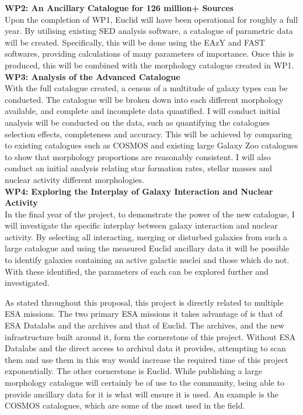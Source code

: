 \documentclass[11pt,usenatbib]{article}
\begin{document}
\noindent \textbf{WP2: An Ancillary Catalogue for 126 million+ Sources} \\
\noindent Upon the completion of WP1, Euclid will have been operational for roughly a full year. By utilising existing SED analysis software, a catalogue of parametric data will be created. Specifically, this will be done using the EAzY and FAST softwares, providing calculations of many parameters of importance. Once this is produced, this will be combined with the morphology catalogue created in WP1. \\

\noindent \textbf{WP3: Analysis of the Advanced Catalogue} \\
With the full catalogue created, a census of a multitude of galaxy types can be conducted. The catalogue will be broken down into each different morphology available, and complete and incomplete data quantified. I will conduct initial analysis will be conducted on the data, such as quantifying the catalogues selection effects, completeness and accuracy. This will be achieved by comparing to existing catalogues such as COSMOS and existing large Galaxy Zoo catalogues to show that morphology proportions are reasonably consistent. I will also conduct an initial analysis relating star formation rates, stellar masses and nuclear activity different morphologies. \\

\noindent \textbf{WP4: Exploring the Interplay of Galaxy Interaction and Nuclear Activity} \\
In the final year of the project, to demonstrate the power of the new catalogue, I will investigate the specific interplay between galaxy interaction and nuclear activity. By selecting all interacting, merging or disturbed galaxies from such a large catalogue and using the measured Euclid ancillary data it will be possible to identify galaxies containing an active galactic nuclei and those which do not. With these identified, the parameters of each can be explored further and investigated.

\synergy
\vspace{-3mm}
As stated throughout this proposal, this project is directly related to multiple ESA missions. The two primary ESA missions it takes advantage of is that of ESA Datalabs and the archives and that of Euclid. The archives, and the new infrastructure built around it, form the cornerstone of this project. Without ESA Datalabs and the direct access to archival data it provides, attempting to scan them and use them in this way would increase the required time of this project exponentially. The other cornerstone is Euclid. While publishing a large morphology catalogue will certainly be of use to the community, being able to provide ancillary data for it is what will ensure it is used. An example is the COSMOS catalogues, which are some of the most used in the field.
\end{document}
